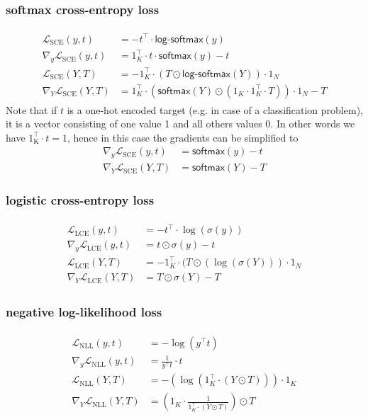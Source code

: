 \documentclass{article}
\newcommand{\const}[1]{\ensuremath{\mathrm{#1}}} %
\newcommand{\func}[1]{\ensuremath{\textsf{#1}}} %
\begin{document}
\subsubsection*{softmax cross-entropy loss}
\begin{align}
\begin{split}
  \mathcal{L}_\text{SCE}(y, t) &= - t^\top \cdot \func{log-softmax}(y)
  \\
  \nabla_y \mathcal{L}_\text{SCE}(y, t) &= 1_K^\top \cdot t \cdot \func{softmax}(y) - t
  \\
  \mathcal{L}_\text{SCE}(Y, T) &= - 1_K^\top \cdot (T \odot \func{log-softmax}(Y)) \cdot 1_N
  \\
  \nabla_Y \mathcal{L}_\text{SCE}(Y, T) &= 1_K^\top \cdot (\func{softmax}(Y) \odot (1_K \cdot 1_K^\top \cdot T)) \cdot 1_N - T
\end{split}  
\end{align}
Note that if $t$ is a one-hot encoded target (e.g. in case of a classification problem),
it is a vector consisting of one value 1 and all others values 0. In other words
we have $1_\const{K}^\top \cdot t = 1$, hence in this case the gradients can be simplified to
\begin{align}
  \nabla_y \mathcal{L}_\text{SCE}(y, t) &= \func{softmax}(y) - t \\
  \nabla_Y \mathcal{L}_\text{SCE}(Y, T) &= \func{softmax}(Y) - T
\end{align}

\subsubsection*{logistic cross-entropy loss}
\begin{align}
  \begin{split}
  \label{eq:logistic-cross-entropy-loss}
  \mathcal{L}_\text{LCE}(y, t) &= - t^\top \cdot \log(\sigma(y))
  \\
  \nabla_y \mathcal{L}_\text{LCE}(y, t) &= t \odot \sigma(y) - t
  \\
  \mathcal{L}_\text{LCE}(Y, T) &= - 1_K^\top \cdot (T \odot (\log(\sigma(Y))) \cdot 1_N
  \\
  \nabla_Y \mathcal{L}_\text{LCE}(Y, T) &= T \odot \sigma(Y) - T
  \end{split}
\end{align}

\subsubsection*{negative log-likelihood loss}
\begin{align}
\begin{split}
  \mathcal{L}_\text{NLL}(y, t) &= - \log(y^\top t)
  \\
  \nabla_y \mathcal{L}_\text{NLL}(y, t) &= \frac{1}{y^\top t} \cdot t
  \\
  \mathcal{L}_\text{NLL}(Y, T) &= -(\log(1_K^\top \cdot (Y \odot T))) \cdot 1_K
  \\
  \nabla_Y \mathcal{L}_\text{NLL}(Y, T) &= \left( 1_K \cdot \frac{1}{1_K^\top \cdot (Y \odot T)} \right) \odot T
\end{split}
\end{align}
\end{document}
